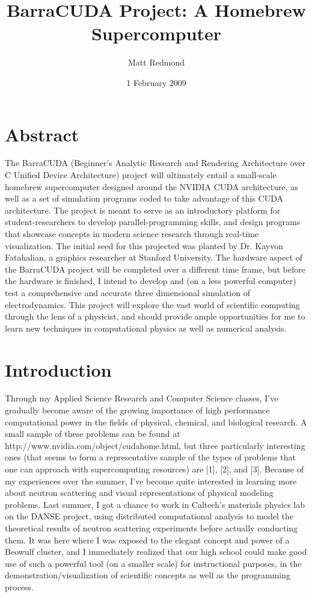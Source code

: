 \documentclass[10pt]{article}
\title{BarraCUDA Project: A Homebrew Supercomputer}  %
\author{Matt Redmond}      %
\date{1 February 2009}
\begin{document}
\maketitle
\tableofcontents
\clearpage

\section{Abstract}
The BarraCUDA (Beginner's Analytic Research and Rendering Architecture over C Unified Device Architecture) project will ultimately entail a small-scale homebrew supercomputer designed around the NVIDIA CUDA architecture, as well as a set of simulation programs coded to take advantage of this CUDA architecture. The project is meant to serve as an introductory platform for student-researchers to develop parallel-programming skills, and design programs that showcase concepts in modern science research through real-time visualization. The initial seed for this projected was planted by Dr. Kayvon Fatahalian, a graphics researcher at Stanford University. The hardware aspect of the BarraCUDA project will be completed over a different time frame, but before the hardware is finished, I intend to develop and (on a less powerful computer) test a comprehensive and accurate three dimensional simulation of electrodynamics. This project will explore the vast world of scientific computing through the lens of a physicist, and should provide ample opportunities for me to learn new techniques in computational physics as well as numerical analysis.

\section{Introduction} %
Through my Applied Science Research and Computer Science classes, I've gradually become aware of the growing importance of high performance computational power in the fields of physical, chemical, and biological research. A small sample of these problems can be found at http://www.nvidia.com/object/cudahome.html, but three particularly interesting ones (that seems to form a representative sample of the types of problems that one can approach with supercomputing resources) are [1], [2], and [3]. Because of my experiences over the summer, I've become quite interested in learning more about neutron scattering and visual representations of physical modeling problems. Last summer, I got a chance to work in Caltech's materials physics lab on the DANSE project, using distributed computational analysis to model the theoretical results of neutron scattering experiments before actually conducting them. It was here where I was exposed to the elegant concept and power of a Beowulf cluster, and I immediately realized that our high school could make good use of such a powerful tool (on a smaller scale) for instructional purposes, in the demonstration/visualization of scientific concepts as well as the programming process.
\end{document}
